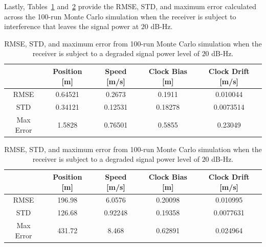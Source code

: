 Lastly, Tables~\ref{tbl:dyn20FVDM} and~\ref{tbl:dyn20CV} provide the RMSE, STD, and maximum error calculated across the 100-run Monte Carlo simulation when the receiver is subject to interference that leaves the signal power at \(20\) dB-Hz.
\begin{table}[!ht]
    \caption{RMSE, STD, and maximum error from 100-run Monte Carlo simulation when the receiver is subject to a degraded signal power level of \(20\) dB-Hz.}\label{tbl:dyn20FVDM}
    \centering
    \begin{tabular}{ccccc}
        \toprule
                  & Position [m] & Speed [m/s] & Clock Bias [m] & Clock Drift [m/s] \\
        \midrule
        RMSE      & 0.64521      & 0.2673      & 0.1911         & 0.010044          \\
        STD       & 0.34121      & 0.12531     & 0.18278        & 0.0073514         \\
        Max Error & 1.5828       & 0.76501     & 0.5855         & 0.23049           \\
        \bottomrule
    \end{tabular}
\end{table}

\begin{table}[!ht]
    \caption{RMSE, STD, and maximum error from 100-run Monte Carlo simulation when the receiver is subject to a degraded signal power level of \(20\) dB-Hz.}\label{tbl:dyn20CV}
    \centering
    \begin{tabular}{ccccc}
        \toprule
                  & Position [m] & Speed [m/s] & Clock Bias [m] & Clock Drift [m/s] \\
        \midrule
        RMSE      & 196.98       & 6.0576      & 0.20098        & 0.010995          \\
        STD       & 126.68       & 0.92248     & 0.19358        & 0.0077631         \\
        Max Error & 431.72       & 8.468       & 0.62891        & 0.024964          \\
        \bottomrule
    \end{tabular}
\end{table}


